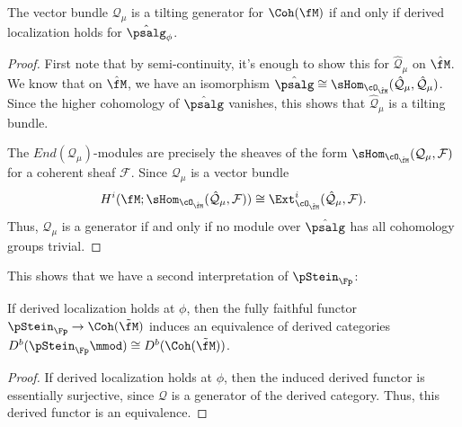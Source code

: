 \begin{lemma}\label{lem:tiling-localization}
The vector bundle $\mathcal{Q}_\mu$ is a tilting generator for $\Coh(\fM)$ if and only if derived localization holds for $\hat{\psalg}_\phi$.  
\end{lemma}
\begin{proof}
First note that by semi-continuity, it's enough to show this for $\mathcal{\hat Q}_\mu$ on $\hat{\fM}$.  We know that on $\hat{\fM}$, we have an isomorphism $\hat{\psalg}\cong \sHom_{\cO_{\hat{\fM}}}(\mathcal{\hat Q}_\mu,\mathcal{\hat Q}_\mu)$.  Since the higher cohomology of $\hat{\psalg}$ vanishes, this shows that $\mathcal{\hat Q}_\mu$ is a tilting bundle.  

The $End(\mathcal{Q}_\mu)$-modules are precisely the sheaves of the form $\sHom_{\cO_{\hat{\fM}}}(\mathcal{Q}_\mu,\mathcal{F})$ for a coherent sheaf $\mathcal{F}$. Since $\mathcal{Q}_\mu$ is a vector bundle \[H^i(\fM;\sHom_{\cO_{\hat{\fM}}}(\mathcal{\hat Q}_\mu,\mathcal{F}))\cong \Ext^i_{\cO_{\hat{\fM}}}(\mathcal{\hat Q}_\mu,\mathcal{F}).\] Thus, $\mathcal{Q}_\mu$ is a generator if and only if no module over $\hat{\psalg}$ has all cohomology groups trivial.   
\end{proof}

This shows that we have a second interpretation of $\pStein_\Fp$: 
\begin{corollary} 
If derived localization holds at $\phi$, then the fully faithful functor  $\pStein_\Fp\to \Coh(\tilde{\fM})$  induces an equivalence of derived categories $D^b(\pStein_\Fp\mmod)\cong D^b(\Coh(\tilde{\fM}))$.
\end{corollary}
\begin{proof}
  If derived localization holds at $\phi$, then the induced derived functor is essentially surjective, since $\mathcal{Q}$ is a generator of the derived category.  Thus, this derived functor is an equivalence. 
\end{proof}

